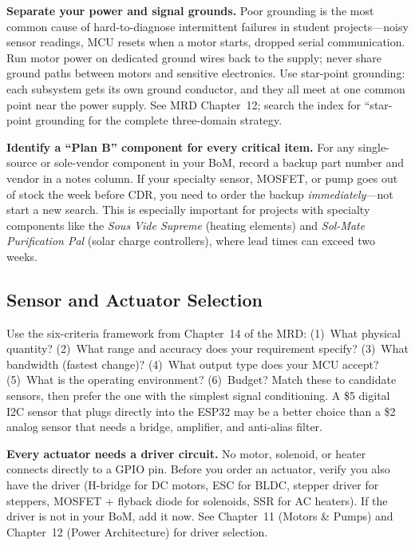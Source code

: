 \begin{warnbox}
\textbf{Separate your power and signal grounds.} Poor grounding is the most common cause of hard-to-diagnose intermittent failures in student projects---noisy sensor readings, MCU resets when a motor starts, dropped serial communication. Run motor power on dedicated ground wires back to the supply; never share ground paths between motors and sensitive electronics. Use star-point grounding: each subsystem gets its own ground conductor, and they all meet at one common point near the power supply. See MRD Chapter~12; search the index for ``star-point grounding for the complete three-domain strategy.
\end{warnbox}

\begin{tipbox}
\textbf{Identify a ``Plan B'' component for every critical item.} For any single-source or sole-vendor component in your BoM, record a backup part number and vendor in a notes column. If your specialty sensor, MOSFET, or pump goes out of stock the week before CDR, you need to order the backup \textit{immediately}---not start a new search. This is especially important for projects with specialty components like the \textit{Sous Vide Supreme} (heating elements) and \textit{Sol-Mate Purification Pal} (solar charge controllers), where lead times can exceed two weeks.
\end{tipbox}

\subsection{Sensor and Actuator Selection}

\begin{faqbox}
Use the six-criteria framework from Chapter~14 of the MRD: (1)~What physical quantity? (2)~What range and accuracy does your requirement specify? (3)~What bandwidth (fastest change)? (4)~What output type does your MCU accept? (5)~What is the operating environment? (6)~Budget? Match these to candidate sensors, then prefer the one with the simplest signal conditioning. A \$5 digital I2C sensor that plugs directly into the ESP32 may be a better choice than a \$2 analog sensor that needs a bridge, amplifier, and anti-alias filter.
\end{faqbox}

\begin{warnbox}
\textbf{Every actuator needs a driver circuit.} No motor, solenoid, or heater connects directly to a GPIO pin. Before you order an actuator, verify you also have the driver (H-bridge for DC motors, ESC for BLDC, stepper driver for steppers, MOSFET + flyback diode for solenoids, SSR for AC heaters). If the driver is not in your BoM, add it now. See Chapter~11 (Motors \& Pumps) and Chapter~12 (Power Architecture) for driver selection.
\end{warnbox}

